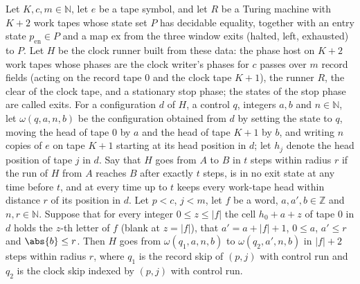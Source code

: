 \begin{lemma}
\label{Turing.cw_seg_skipS}
\leanok
{}
Let $K,c,m\in\mathbb{N}$, let $e$ be a tape symbol, and let $R$ be a Turing machine with $K+2$
work tapes whose state set $P$ has decidable equality, together with an entry state
$p_{\mathrm{en}}\in P$ and a map $\mathrm{ex}$ from the three window exits (halted, left,
exhausted) to $P$. Let $H$ be the clock runner built from these data: the phase host on $K+2$
work tapes whose phases are the clock writer's phases for $c$ passes over $m$ record fields
(acting on the record tape $0$ and the clock tape $K+1$), the runner $R$, the clear of the
clock tape, and a stationary stop phase; the states of the stop phase are called exits. For a
configuration $d$ of $H$, a control $q$, integers $a,b$ and $n\in\mathbb{N}$, let
$\omega(q,a,n,b)$ be the configuration obtained from $d$ by setting the state to $q$, moving
the head of tape $0$ by $a$ and the head of tape $K+1$ by $b$, and writing $n$ copies of $e$ on
tape $K+1$ starting at its head position in $d$; let $h_j$ denote the head position of tape $j$
in $d$. Say that $H$ goes from $A$ to $B$ in $t$ steps within radius $r$ if the run of $H$ from
$A$ reaches $B$ after exactly $t$ steps, is in no exit state at any time before $t$, and at
every time up to $t$ keeps every work-tape head within distance $r$ of its position in $d$. Let
$p<c$, $j<m$, let $f$ be a word, $a,a',b\in\mathbb{Z}$ and $n,r\in\mathbb{N}$. Suppose that for
every integer $0\le z\le|f|$ the cell $h_0+a+z$ of tape $0$ in $d$ holds the $z$-th letter of
$f$ (blank at $z=|f|$), that $a'=a+|f|+1$, $0\le a$, $a'\le r$ and $\abs{b}\le r$. Then $H$
goes from $\omega(q_1,a,n,b)$ to $\omega(q_2,a',n,b)$ in $|f|+2$ steps within radius $r$, where
$q_1$ is the record skip of $(p,j)$ with control run and $q_2$ is the clock skip indexed by
$(p,j)$ with control run.
\end{lemma}


